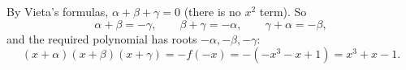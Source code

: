 By Vieta's formulas, $\alpha+\beta+\gamma=0$ (there is no $x^2$ term). So
\[\alpha+\beta=-\gamma,\qquad\beta+\gamma=-\alpha,\qquad\gamma+\alpha=-\beta,\]
and the required polynomial has roots $-\alpha,-\beta,-\gamma$:
\[(x+\alpha)(x+\beta)(x+\gamma)=-f(-x)=-\left(-x^3-x+1\right)=\boxed{x^3+x-1}.\]
